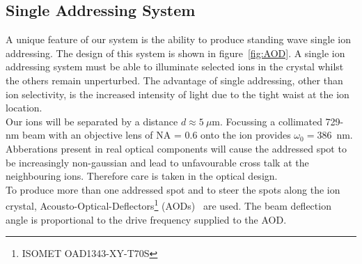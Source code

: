 \subsection{Single Addressing System}
\label{sec:Single Addressing System}
    A unique feature of our system is the ability to produce standing wave
    single ion addressing. The design of this system is shown in
    figure~\ref{fig:AOD}.  A single ion addressing system must be able to
    illuminate selected ions in the crystal whilst the others remain
    unperturbed. The advantage of single addressing, other than ion selectivity,
    is the increased intensity of light due to the tight waist at the ion
    location. \\
    Our ions will be separated by a distance $d\approx 5~\mu$m.  Focussing a
    collimated 729-nm beam with an objective lens of NA = 0.6 onto the ion
    provides $\omega_0 = 386$~nm.  Abberations present in real optical
    components will cause the addressed spot to be increasingly non-gaussian and
    lead to unfavourable cross talk at the neighbouring ions. Therefore care is
    taken in the optical design.\\
    To produce more than one addressed spot and to steer the spots along the ion
    crystal, Acousto-Optical-Deflectors\footnote{ISOMET OAD1343-XY-T70S}
    (AODs)~\cite{nagourney_quantum_2014, li_low-crosstalk_2023,
    pogorelov_compact_2021} are used. The beam deflection angle is proportional to the
    drive frequency supplied to the AOD. \\